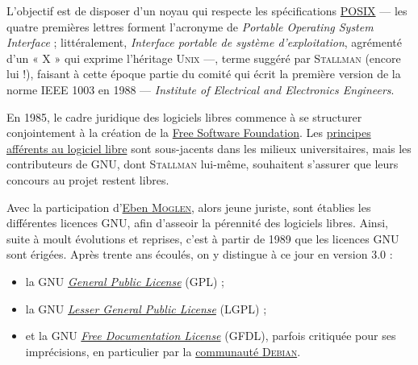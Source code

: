 %
L'objectif est de disposer d'un noyau qui respecte les spécifications \href{https://fr.wikipedia.org/wiki/POSIX}{POSIX} --- les quatre premières lettres forment l’acronyme de \textit{Portable Operating System Interface} ; littéralement, \textit{Interface portable de systè\-me d'exploitation}, agrémenté d'un « X » qui exprime l'héritage \textsc{Unix} ---, terme suggéré par \textsc{Stallman} (encore lui !), faisant à cette époque partie du comité qui écrit la première version de la norme IEEE 1003 en 1988 ---  \textit{Institute of Electrical and Electronics Engineers}.

%
En 1985, le cadre juridique des logiciels libres commence à se structurer conjointement à la création de la \href{https://www.fsf.org/}{Free Software Foundation}. Les \href{https://fr.wikipedia.org/wiki/Histoire_du_logiciel_libre}{principes afférents au logiciel libre} sont sous-jacents dans les milieux universitaires, mais les contributeurs de GNU, dont \textsc{Stallman} lui-même, souhaitent s'assurer que leurs concours au projet restent libres.

Avec la participation d'\href{https://fr.wikipedia.org/wiki/Eben_Moglen}{Eben \textsc{Moglen}}, alors jeune juriste, sont établies les différentes licences GNU, afin d’asseoir la pérennité des logiciels libres. Ainsi, suite à moult évolutions et reprises, c'est à partir de 1989 que les licences GNU sont érigées. Après trente ans écoulés, on y distingue à ce jour en version 3.0 :
\begin{itemize}
	\item la GNU \href{https://fr.wikipedia.org/wiki/Licence_publique_g\%C3\%A9n\%C3\%A9rale_GNU}{\textit{General Public License}} (GPL) ;
	\item la GNU \href{https://fr.wikipedia.org/wiki/Licence_publique_g\%C3\%A9n\%C3\%A9rale_limit\%C3\%A9e_GNU}{\textit{Lesser General Public License}} (LGPL) ;
	\item et la GNU \href{https://fr.wikipedia.org/wiki/Licence_de_documentation_libre_GNU}{\textit{Free Documentation License}} (GFDL), parfois critiquée pour ses imprécisions, en particulier par la \href{https://www.debian.org/vote/2006/vote_001}{communauté \textsc{Debian}}. 
\end{itemize}


